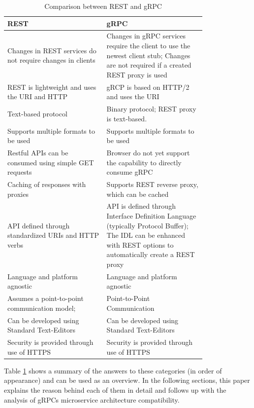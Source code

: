 \documentclass[conference]{IEEEtran}
\begin{document}
\begin{table}[!htbp]
        \centering
        \caption{Comparison between REST and gRPC}
        \label{fig:compRestGrpc}
        \begin{tabular}{| p{0.4\linewidth} | p{0.4\linewidth}|}\hline
                REST & gRPC \\\hline
                Changes in REST services do not require changes in clients & Changes in gRPC services require the client to use the newest client stub; Changes are not required if a created REST proxy is used\\\hline
                REST is lightweight and uses the URI and HTTP & gRCP is based on HTTP/2 and uses the URI\\\hline
                Text-based protocol & Binary protocol; REST proxy is text-based.\\\hline
                Supports multiple formats to be used & Supports multiple formats to be used \\\hline
                Restful APIs can be consumed using simple GET requests & Browser do not yet support the capability to directly consume gRPC \\\hline
                Caching of responses with proxies & Supports REST reverse proxy, which can be cached\\\hline
                API defined through standardized URIs and HTTP verbs & API is defined through Interface Definition Language (typically Protocol Buffer); The IDL can be enhanced with REST options to automatically create a REST proxy \\\hline
                Language and platform agnostic & Language and platform agnostic\\\hline
                Assumes a point-to-point communication model; & Point-to-Point Communication\\\hline
                Can be developed using Standard Text-Editors & Can be developed using Standard Text-Editors\\\hline
                Security is provided through use of HTTPS & Security is provided through use of HTTPS\\\hline
        \end{tabular}
\end{table}

Table \ref{fig:compRestGrpc} shows a summary of the answers to these categories (in order of appearance) and can be used as an overview. In the following sections, this paper explains the reason behind each of them in detail and follows up with the analysis of gRPCs microservice architecture compatibility.
\end{document}
